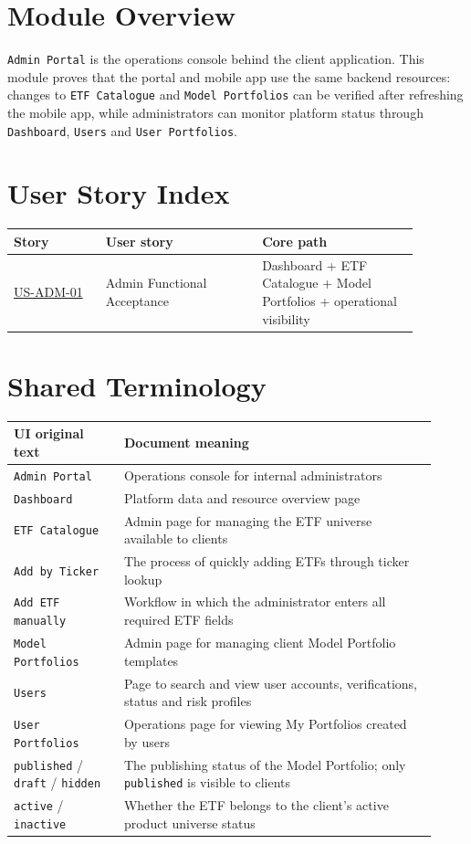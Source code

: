 \section{Module Overview}
\texttt{Admin Portal} is the operations console behind the client application. This module proves that the portal and mobile app use the same backend resources: changes to \texttt{ETF Catalogue} and \texttt{Model Portfolios} can be verified after refreshing the mobile app, while administrators can monitor platform status through \texttt{Dashboard}, \texttt{Users} and \texttt{User Portfolios}.
\section{User Story Index}
\begingroup
\small
\begin{longtable}{L{0.20\linewidth}L{0.34\linewidth}L{0.34\linewidth}}
\toprule
\textbf{Story} & \textbf{User story} & \textbf{Core path} \\
\midrule
\hyperlink{us-adm-01}{US-ADM-01} & Admin Functional Acceptance & Dashboard + ETF Catalogue + Model Portfolios + operational visibility \\
\bottomrule
\end{longtable}
\endgroup
\section{Shared Terminology}
\begingroup
\small
\begin{longtable}{L{0.24\linewidth}L{0.68\linewidth}}
\toprule
\textbf{UI original text} & \textbf{Document meaning} \\
\midrule
\texttt{Admin Portal} & Operations console for internal administrators \\
\texttt{Dashboard} & Platform data and resource overview page \\
\texttt{ETF Catalogue} & Admin page for managing the ETF universe available to clients \\
\texttt{Add by Ticker} & The process of quickly adding ETFs through ticker lookup \\
\texttt{Add ETF manually} & Workflow in which the administrator enters all required ETF fields \\
\texttt{Model Portfolios} & Admin page for managing client Model Portfolio templates \\
\texttt{Users} & Page to search and view user accounts, verifications, status and risk profiles \\
\texttt{User Portfolios} & Operations page for viewing My Portfolios created by users \\
\texttt{published} /\allowbreak{} \texttt{draft} /\allowbreak{} \texttt{hidden} & The publishing status of the Model Portfolio; only \texttt{published} is visible to clients \\
\texttt{active} /\allowbreak{} \texttt{inactive} & Whether the ETF belongs to the client's active product universe status \\
\bottomrule
\end{longtable}
\endgroup
\prdhr
\hypertarget{us-adm-01}{}
